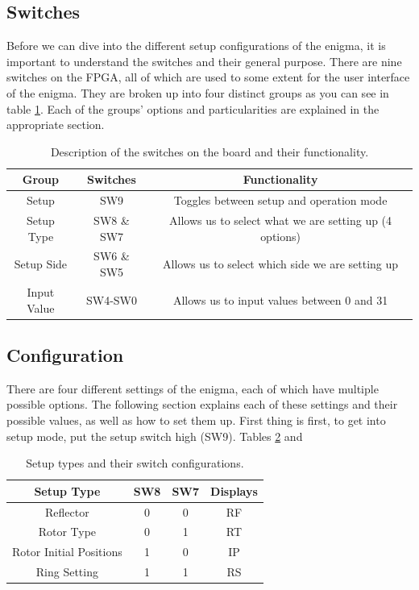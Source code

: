 \documentclass{article}
\begin{document}
\subsection{Switches}
Before we can dive into the different setup configurations of the enigma, it is important to understand the switches and their general purpose. There are nine switches on the FPGA, all of which are used to some extent for the user interface of the enigma. They are broken up into four distinct groups as you can see in table \ref{tab:gen_switch_func}. Each of the groups' options and particularities are explained in the appropriate section. 

\begin{table}[ht!]
    \centering
    \begin{tabular}{|c|c|c|}
        \hline
        Group & Switches & Functionality \\
        \hline \hline
        Setup& \small{SW9} & \footnotesize{Toggles between setup and operation mode} \\
        \hline
        Setup Type & \small{SW8 \& SW7} & \footnotesize{Allows us to select what we are setting up (4 options)} \\
        \hline
        Setup Side & \small{SW6 \& SW5} & \footnotesize{Allows us to select which side we are setting up} \\
        \hline
        Input Value & \small{SW4-SW0} & \footnotesize{Allows us to input values between 0 and 31} \\
        \hline
    \end{tabular}
    \caption{Description of the switches on the board and their functionality.}
    \label{tab:gen_switch_func}
\end{table}

\subsection{Configuration}
There are four different settings of the enigma, each of which have multiple possible options. The following section explains each of these settings and their possible values, as well as how to set them up. First thing is first, to get into setup mode, put the setup switch high (SW9). Tables \ref{tab:setup_types} and 


\begin{table}[ht!]
    \centering
    \begin{tabular}{|c|c|c|c|}
        \hline
        Setup Type & SW8 & SW7 & Displays \\
        \hline \hline
        Reflector & 0 & 0 & RF \\
        \hline
        Rotor Type & 0 & 1 & RT \\
        \hline 
        Rotor Initial Positions & 1 & 0 & IP \\
        \hline
        Ring Setting & 1 & 1 & RS \\
        \hline
    \end{tabular}
    \caption{Setup types and their switch configurations.}
    \label{tab:setup_types}
\end{table}
\end{document}
